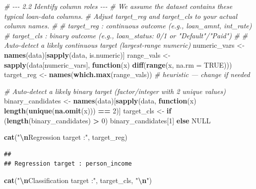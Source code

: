 \documentclass[
]{article}
\newenvironment{Shaded}{\begin{snugshade}}{\end{snugshade}}
\newcommand{\AttributeTok}[1]{\textcolor[rgb]{0.13,0.29,0.53}{#1}}
\newcommand{\CommentTok}[1]{\textcolor[rgb]{0.56,0.35,0.01}{\textit{#1}}}
\newcommand{\ConstantTok}[1]{\textcolor[rgb]{0.56,0.35,0.01}{#1}}
\newcommand{\ControlFlowTok}[1]{\textcolor[rgb]{0.13,0.29,0.53}{\textbf{#1}}}
\newcommand{\DecValTok}[1]{\textcolor[rgb]{0.00,0.00,0.81}{#1}}
\newcommand{\FunctionTok}[1]{\textcolor[rgb]{0.13,0.29,0.53}{\textbf{#1}}}
\newcommand{\NormalTok}[1]{#1}
\newcommand{\OtherTok}[1]{\textcolor[rgb]{0.56,0.35,0.01}{#1}}
\newcommand{\SpecialCharTok}[1]{\textcolor[rgb]{0.81,0.36,0.00}{\textbf{#1}}}
\newcommand{\StringTok}[1]{\textcolor[rgb]{0.31,0.60,0.02}{#1}}
\begin{document}
\begin{Shaded}
\begin{Highlighting}[]
\CommentTok{\# {-}{-}{-} 2.2  Identify column roles {-}{-}{-}}
\CommentTok{\# We assume the dataset contains these typical loan{-}data columns.}
\CommentTok{\# Adjust \textasciigrave{}target\_reg\textasciigrave{} and \textasciigrave{}target\_cls\textasciigrave{} to your actual column names.}
\CommentTok{\#}
\CommentTok{\#   target\_reg : continuous outcome (e.g., loan\_amnt, int\_rate)}
\CommentTok{\#   target\_cls : binary outcome    (e.g., loan\_status: 0/1 or "Default"/"Paid")}
\CommentTok{\#}
\CommentTok{\# Auto{-}detect a likely continuous target (largest{-}range numeric)}
\NormalTok{numeric\_vars  }\OtherTok{\textless{}{-}} \FunctionTok{names}\NormalTok{(data)[}\FunctionTok{sapply}\NormalTok{(data, is.numeric)]}
\NormalTok{range\_vals    }\OtherTok{\textless{}{-}} \FunctionTok{sapply}\NormalTok{(data[numeric\_vars], }\ControlFlowTok{function}\NormalTok{(x) }\FunctionTok{diff}\NormalTok{(}\FunctionTok{range}\NormalTok{(x, }\AttributeTok{na.rm =} \ConstantTok{TRUE}\NormalTok{)))}
\NormalTok{target\_reg    }\OtherTok{\textless{}{-}} \FunctionTok{names}\NormalTok{(}\FunctionTok{which.max}\NormalTok{(range\_vals))   }\CommentTok{\# heuristic — change if needed}

\CommentTok{\# Auto{-}detect a likely binary target (factor/integer with 2 unique values)}
\NormalTok{binary\_candidates }\OtherTok{\textless{}{-}} \FunctionTok{names}\NormalTok{(data)[}\FunctionTok{sapply}\NormalTok{(data, }\ControlFlowTok{function}\NormalTok{(x) }\FunctionTok{length}\NormalTok{(}\FunctionTok{unique}\NormalTok{(}\FunctionTok{na.omit}\NormalTok{(x))) }\SpecialCharTok{==} \DecValTok{2}\NormalTok{)]}
\NormalTok{target\_cls }\OtherTok{\textless{}{-}} \ControlFlowTok{if}\NormalTok{ (}\FunctionTok{length}\NormalTok{(binary\_candidates) }\SpecialCharTok{\textgreater{}} \DecValTok{0}\NormalTok{) binary\_candidates[}\DecValTok{1}\NormalTok{] }\ControlFlowTok{else} \ConstantTok{NULL}

\FunctionTok{cat}\NormalTok{(}\StringTok{"}\SpecialCharTok{\textbackslash{}n}\StringTok{Regression target :"}\NormalTok{, target\_reg)}
\end{Highlighting}
\end{Shaded}

\begin{verbatim}
## 
## Regression target : person_income
\end{verbatim}

\begin{Shaded}
\begin{Highlighting}[]
\FunctionTok{cat}\NormalTok{(}\StringTok{"}\SpecialCharTok{\textbackslash{}n}\StringTok{Classification target :"}\NormalTok{, target\_cls, }\StringTok{"}\SpecialCharTok{\textbackslash{}n}\StringTok{"}\NormalTok{)}
\end{Highlighting}
\end{Shaded}
\end{document}
